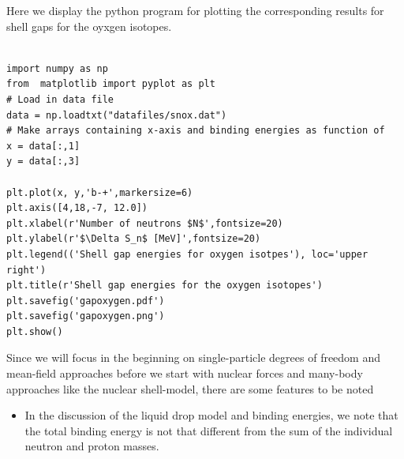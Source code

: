 \documentclass[%
twoside,                 %
final,                   %
10pt]{article}
\begin{document}
Here we display the python program for plotting the corresponding results for shell gaps for the oyxgen isotopes. 
\begin{verbatim}

import numpy as np
from  matplotlib import pyplot as plt
# Load in data file
data = np.loadtxt("datafiles/snox.dat")
# Make arrays containing x-axis and binding energies as function of
x = data[:,1]
y = data[:,3]

plt.plot(x, y,'b-+',markersize=6)
plt.axis([4,18,-7, 12.0])
plt.xlabel(r'Number of neutrons $N$',fontsize=20)
plt.ylabel(r'$\Delta S_n$ [MeV]',fontsize=20)
plt.legend(('Shell gap energies for oxygen isotpes'), loc='upper right')
plt.title(r'Shell gap energies for the oxygen isotopes')
plt.savefig('gapoxygen.pdf')
plt.savefig('gapoxygen.png')
plt.show()
\end{verbatim}





Since we will focus in the beginning on single-particle degrees of freedom and mean-field approaches before we
start with nuclear forces and many-body approaches like the nuclear shell-model, there are some features to be noted

\begin{itemize}
\item In the discussion of the liquid drop model and binding energies, we note that the total binding energy is not that different from the sum of the individual neutron and proton masses. 
\end{itemize}
\end{document}
